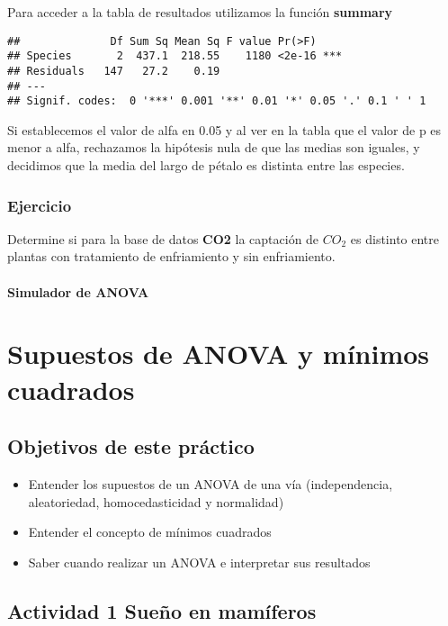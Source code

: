 \documentclass[]{book}
\providecommand{\tightlist}{%
  \setlength{\itemsep}{0pt}\setlength{\parskip}{0pt}}
\begin{document}
Para acceder a la tabla de resultados utilizamos la función
\textbf{summary}

\begin{verbatim}
##              Df Sum Sq Mean Sq F value Pr(>F)    
## Species       2  437.1  218.55    1180 <2e-16 ***
## Residuals   147   27.2    0.19                   
## ---
## Signif. codes:  0 '***' 0.001 '**' 0.01 '*' 0.05 '.' 0.1 ' ' 1
\end{verbatim}

Si establecemos el valor de alfa en 0.05 y al ver en la tabla que el
valor de p es menor a alfa, rechazamos la hipótesis nula de que las
medias son iguales, y decidimos que la media del largo de pétalo es
distinta entre las especies.

\subsection{Ejercicio}\label{ejercicio}

Determine si para la base de datos \textbf{CO2} la captación de \(CO_2\)
es distinto entre plantas con tratamiento de enfriamiento y sin
enfriamiento.

\subsubsection{Simulador de ANOVA}\label{simulador-de-anova}

\chapter{Supuestos de ANOVA y mínimos cuadrados}\label{Supuestos}

\section{Objetivos de este práctico}\label{objetivos-de-este-practico}

\begin{itemize}
\tightlist
\item
  Entender los supuestos de un ANOVA de una vía (independencia,
  aleatoriedad, homocedasticidad y normalidad)
\item
  Entender el concepto de mínimos cuadrados
\item
  Saber cuando realizar un ANOVA e interpretar sus resultados
\end{itemize}

\section{Actividad 1 Sueño en
mamíferos}\label{actividad-1-sueno-en-mamiferos}
\end{document}
